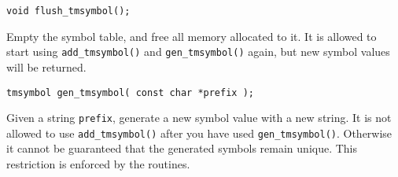 \begin{verbatim}
void flush_tmsymbol();
\end{verbatim}
\begin{desc}
Empty the symbol table, and free all memory allocated to it.
It is allowed to start using \verb+add_tmsymbol()+
and \verb+gen_tmsymbol()+ again,
but new symbol values will be returned.
\end{desc}
\begin{verbatim}
tmsymbol gen_tmsymbol( const char *prefix );
\end{verbatim}
\begin{desc}
Given a string {\tt prefix}, generate a new symbol value with a new string.
It is not allowed to use \verb+add_tmsymbol()+ after you have used
\verb+gen_tmsymbol()+.
Otherwise it cannot be guaranteed that the generated symbols remain unique.
This restriction is enforced by the routines.
\end{desc}
